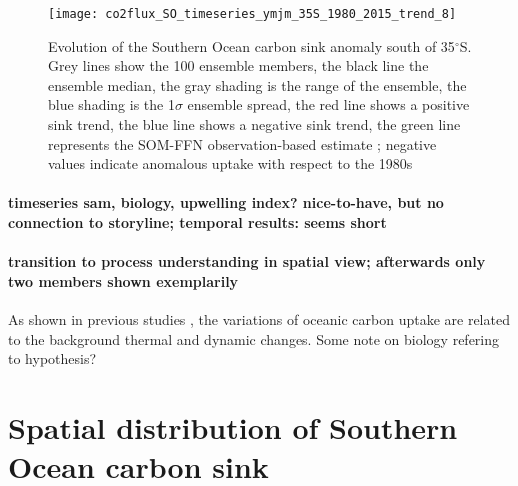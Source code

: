 \documentclass[12pt]{article}
\begin{document}
\begin{figure}[h!]
	\texttt{[image: co2flux\_SO\_timeseries\_ymjm\_35S\_1980\_2015\_trend\_8]}
	\caption{Evolution of the Southern Ocean carbon sink anomaly south of 35$^\circ$S. Grey lines show the 100 ensemble members, the black line the ensemble median, the gray shading is the range of the ensemble, the blue shading is the 1$\sigma$ ensemble spread, the red line shows a positive sink trend, the blue line shows a negative sink trend, the green line represents the SOM-FFN observation-based estimate \citep{landschuetzer2015}; negative values indicate anomalous uptake with respect to the 1980s}
\label{fig:evolution_southern_ocean_carbon_sink}
\end{figure}


\paragraph{timeseries sam, biology, upwelling index? nice-to-have, but no connection to storyline; temporal results: seems short}



\paragraph{transition to process understanding in spatial view; afterwards only two members shown exemplarily}
As shown in previous studies \citep{LeQuere2007}, the variations of oceanic carbon uptake are related to the background thermal and dynamic changes. Some note on biology refering to hypothesis?


\clearpage

\section{Spatial distribution of Southern Ocean carbon sink}
\end{document}
